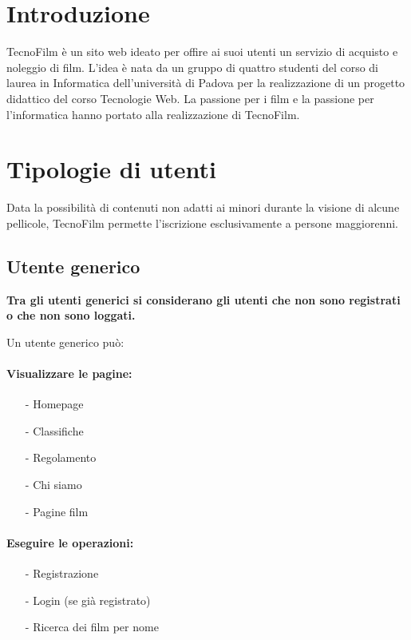 \documentclass[a4paper]{article}
\begin{document}
\newpage
\section{Introduzione}
TecnoFilm è un sito web ideato per offire ai suoi utenti un servizio di acquisto e noleggio di film.
L'idea è nata da un gruppo di quattro studenti del corso di laurea in Informatica dell'università di Padova per la realizzazione di un progetto didattico del corso Tecnologie Web.
La passione per i film e la passione per l'informatica hanno portato alla realizzazione di TecnoFilm.

\section{Tipologie di utenti}
Data la possibilità di contenuti non adatti ai minori durante la visione di alcune pellicole, TecnoFilm permette l'iscrizione esclusivamente a persone maggiorenni.
\subsection{Utente generico}
\textbf{Tra gli utenti generici si considerano gli utenti che non sono registrati o che non sono loggati.}

\noindent Un utente generico può:
    \paragraph*{Visualizzare le pagine:}
        \begin{itemize}
            \item[-] Homepage
            \item[-] Classifiche
            \item[-] Regolamento
            \item[-] Chi siamo
            \item[-] Pagine film
        \end{itemize}
    \paragraph*{Eseguire le operazioni:}
        \begin{itemize}
            \item[-] Registrazione
            \item[-] Login (se già registrato)
            \item[-] Ricerca dei film per nome
        \end{itemize}
\end{document}
